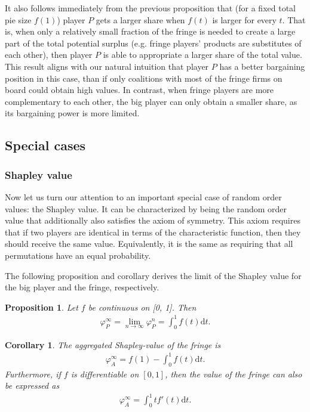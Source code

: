 \documentclass[a4paper]{article}
\newtheorem{proposition}{Proposition}
\newtheorem{corollary}{Corollary}
\newcommand{\dt}{\mathrm{d}t}
\begin{document}
It also follows immediately from the previous proposition that (for a fixed total pie size $f(1)$) player $P$ gets a larger share when $f(t)$ is larger for every $t$.
That is, when only a relatively small fraction of the fringe is needed to create a large part of the total potential surplus (e.g. fringe players' products are substitutes of each other), then player $P$ is able to appropriate a larger share of the total value.
This result aligns with our natural intuition that player $P$ has a better bargaining position in this case, than if only coalitions with most of the fringe firms on board could obtain high values.
In contrast, when fringe players are more complementary to each other, the big player can only obtain a smaller share, as its bargaining power is more limited.


\subsection{Special cases}
\subsubsection{Shapley value}

Now let us turn our attention to an important special case of random order values: the Shapley value.
It can be characterized by being the random order value that additionally also satisfies the axiom of symmetry.
This axiom requires that if two players are identical in terms of the characteristic function, then they should receive the same value.
Equivalently, it is the same as requiring that all permutations have an equal probability.

The following proposition and corollary derives the limit of the Shapley value for the big player and the fringe, respectively.

\begin{proposition}
    \label{prop:one_sided}
    Let $f$ be continuous on [0, 1]. Then
    \begin{align*}
        \varphi_P^\infty = \lim_{n \to \infty} \varphi_P^n = \int_0^1 f(t) \dt .
    \end{align*}
\end{proposition}

\begin{corollary}
    \label{cor:fringe_value}
    The aggregated Shapley-value of the fringe is
    \begin{align*}
        \varphi_A^\infty = f(1) - \int_0^1 f(t) \dt.
    \end{align*}
    Furthermore, if $f$ is differentiable on $[0, 1]$, then the value of the fringe can also be expressed as
    \begin{align*}
        \varphi_A^\infty = \int_0^1 t f'(t) \dt.
    \end{align*}
\end{corollary}
\end{document}

